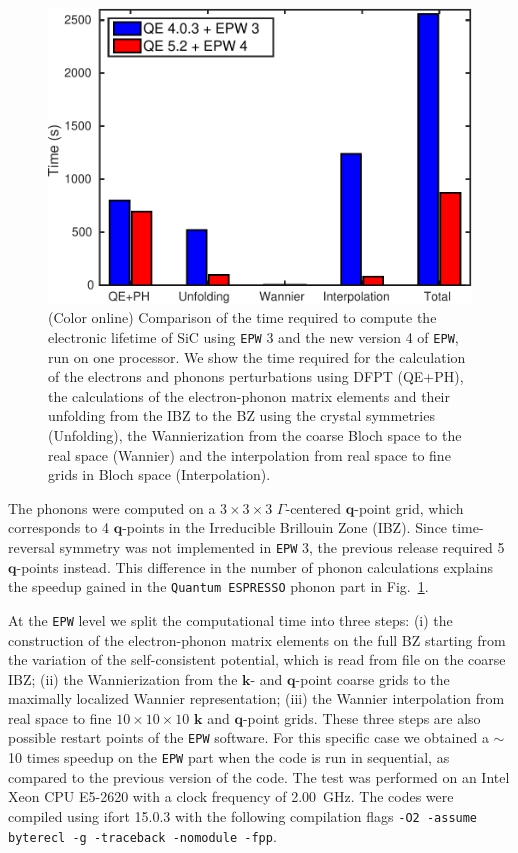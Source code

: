 \documentclass[final,3p,times,twocolumn]{elsarticle}
\begin{document}
\begin{figure}[b!]
  \centering
  \includegraphics[width=0.9\linewidth]{EPW_speedup3.pdf}
  \caption{\label{Speedup}(Color online) Comparison of the time required to compute the electronic lifetime of SiC using \texttt{EPW} 3 and the new version 4 of \texttt{EPW}, run on one processor. We show the time required for the calculation of the electrons and phonons perturbations using DFPT (QE+PH), the calculations of the electron-phonon matrix elements and their unfolding from the IBZ to the BZ using the crystal symmetries (Unfolding), the Wannierization from the coarse Bloch space to the real space (Wannier) and the interpolation from real space to fine grids in Bloch space (Interpolation). }
\end{figure}

The phonons were computed on a $3\times3\times3$ $\Gamma$-centered $\mathbf{q}$-point grid, which corresponds to 4 $\mathbf{q}$-points in the Irreducible Brillouin Zone (IBZ). Since time-reversal symmetry was not implemented in \texttt{EPW} 3, the previous release required 5 $\mathbf{q}$-points instead. This difference in the number of phonon calculations explains the speedup gained in the \texttt{Quantum ESPRESSO} phonon part in Fig.~\ref{Speedup}. 

At the \texttt{EPW} level we split the computational time into three steps: (i) the construction of the electron-phonon matrix elements on the full BZ starting from the variation of the self-consistent potential, which is read from file on the coarse IBZ; (ii) the Wannierization from the  $\mathbf{k}$- and $\mathbf{q}$-point coarse grids to the maximally localized Wannier representation; (iii) the Wannier interpolation from real space to fine $10\times10\times10$ $\mathbf{k}$ and $\mathbf{q}$-point grids. 
These three steps are also possible restart points of the \texttt{EPW} software. 
For this specific case we obtained a $\sim$10 times speedup on the \texttt{EPW} part when the code is run in sequential, as compared to the previous version of the code. 
The test was performed on an Intel Xeon CPU E5-2620 with a clock frequency of 2.00~GHz.
The codes were compiled using ifort 15.0.3 with the following compilation flags \texttt{-O2 -assume byterecl -g -traceback -nomodule -fpp}. 
\end{document}
